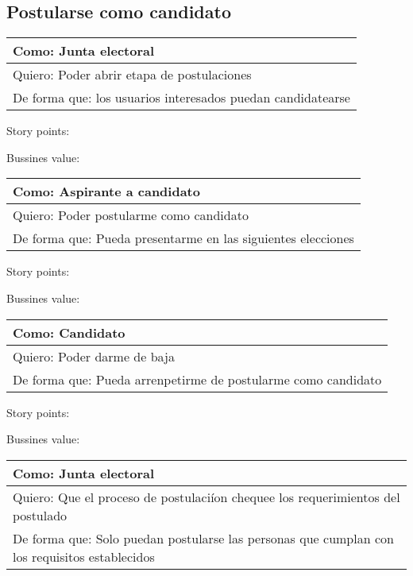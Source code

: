 \bigskip


\subsection{Postularse como candidato}

\begin{tabular}{|l|}
\hline
Como: Junta electoral\\
\hline
Quiero: Poder abrir etapa de postulaciones\\
\hline
De forma que: los usuarios interesados puedan candidatearse \\
\hline
\end{tabular}

\medskip
Story points:

\medskip
Bussines value:

\bigskip

\begin{tabular}{|l|}
\hline
Como: Aspirante a candidato\\
\hline
Quiero: Poder postularme como candidato\\
\hline
De forma que: Pueda presentarme en las siguientes elecciones \\
\hline
\end{tabular}

\medskip
Story points:

\medskip
Bussines value:


\bigskip

\begin{tabular}{|l|}
\hline
Como: Candidato\\
\hline
Quiero: Poder darme de baja\\
\hline
De forma que: Pueda arrenpetirme de postularme como candidato \\
\hline
\end{tabular}

\medskip
Story points:

\medskip
Bussines value:


\bigskip

\begin{tabular}{|l|}
\hline
Como: Junta electoral\\
\hline
Quiero: Que el proceso de postulaci\'ion chequee los requerimientos del postulado\\
\hline
De forma que: Solo puedan postularse las personas que cumplan con los requisitos establecidos \\
\hline
\end{tabular}

